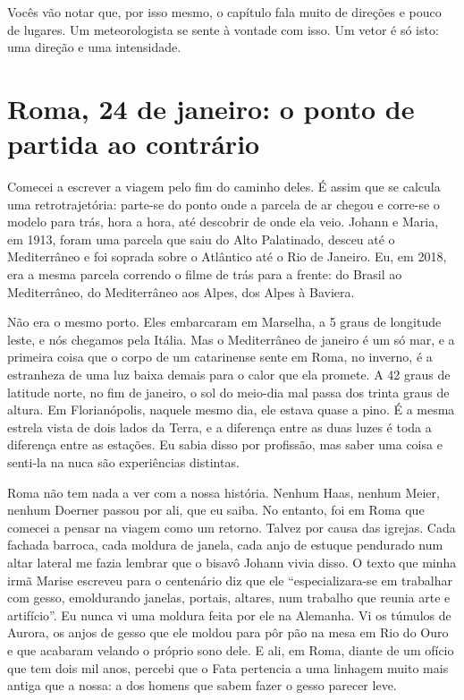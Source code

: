 \documentclass[
  brazilian,
  11pt,
  openany]{book}
\begin{document}
Vocês vão notar que, por isso mesmo, o capítulo fala muito de direções e
pouco de lugares. Um meteorologista se sente à vontade com isso. Um
vetor é só isto: uma direção e uma intensidade.

\section{Roma, 24 de janeiro: o ponto de partida ao
contrário}\label{roma-24-de-janeiro-o-ponto-de-partida-ao-contruxe1rio}

Comecei a escrever a viagem pelo fim do caminho deles. É assim que se
calcula uma retrotrajetória: parte-se do ponto onde a parcela de ar
chegou e corre-se o modelo para trás, hora a hora, até descobrir de onde
ela veio. Johann e Maria, em 1913, foram uma parcela que saiu do Alto
Palatinado, desceu até o Mediterrâneo e foi soprada sobre o Atlântico
até o Rio de Janeiro. Eu, em 2018, era a mesma parcela correndo o filme
de trás para a frente: do Brasil ao Mediterrâneo, do Mediterrâneo aos
Alpes, dos Alpes à Baviera.

Não era o mesmo porto. Eles embarcaram em Marselha, a 5 graus de
longitude leste, e nós chegamos pela Itália. Mas o Mediterrâneo de
janeiro é um só mar, e a primeira coisa que o corpo de um catarinense
sente em Roma, no inverno, é a estranheza de uma luz baixa demais para o
calor que ela promete. A 42 graus de latitude norte, no fim de janeiro,
o sol do meio-dia mal passa dos trinta graus de altura. Em
Florianópolis, naquele mesmo dia, ele estava quase a pino. É a mesma
estrela vista de dois lados da Terra, e a diferença entre as duas luzes
é toda a diferença entre as estações. Eu sabia disso por profissão, mas
saber uma coisa e senti-la na nuca são experiências distintas.

Roma não tem nada a ver com a nossa história. Nenhum Haas, nenhum Meier,
nenhum Doerner passou por ali, que eu saiba. No entanto, foi em Roma que
comecei a pensar na viagem como um retorno. Talvez por causa das
igrejas. Cada fachada barroca, cada moldura de janela, cada anjo de
estuque pendurado num altar lateral me fazia lembrar que o bisavô Johann
vivia disso. O texto que minha irmã Marise escreveu para o centenário
diz que ele ``especializara-se em trabalhar com gesso, emoldurando
janelas, portais, altares, num trabalho que reunia arte e artifício''.
Eu nunca vi uma moldura feita por ele na Alemanha. Vi os túmulos de
Aurora, os anjos de gesso que ele moldou para pôr pão na mesa em Rio do
Ouro e que acabaram velando o próprio sono dele. E ali, em Roma, diante
de um ofício que tem dois mil anos, percebi que o Fata pertencia a uma
linhagem muito mais antiga que a nossa: a dos homens que sabem fazer o
gesso parecer leve.
\end{document}
